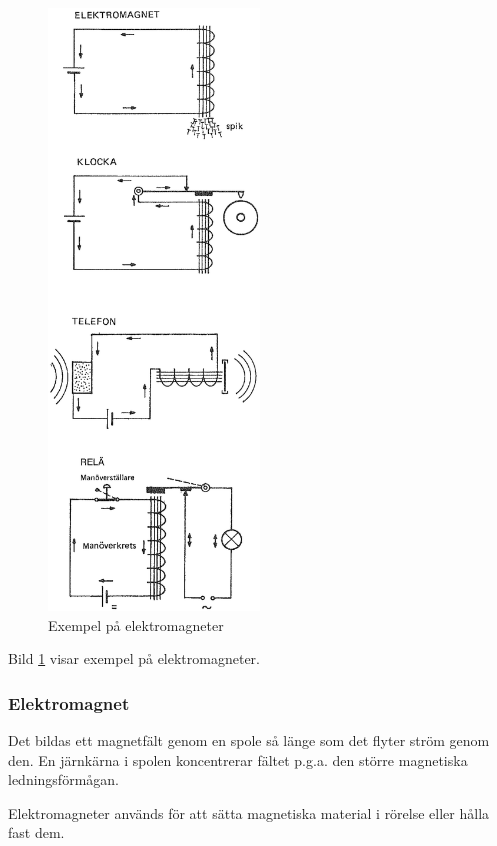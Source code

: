 \begin{figure}
  \includegraphics[width=0.5\textwidth]{images/cropped_pdfs/bild_2_1-09.pdf}
  \caption{Exempel på elektromagneter}
  \label{fig:BildII1-9}
\end{figure}

Bild \ref{fig:BildII1-9} visar exempel på elektromagneter.

\subsubsection{Elektromagnet}
Det bildas ett magnetfält genom en spole så länge som det flyter ström genom
den.
En järnkärna i spolen koncentrerar fältet p.g.a. den större magnetiska
ledningsförmågan.

Elektromagneter används för att sätta magnetiska material i rörelse eller hålla
fast dem.

